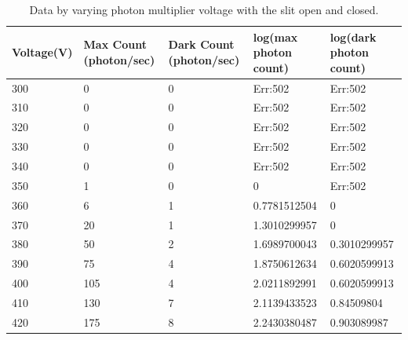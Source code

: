 \documentclass[12pt letterpaper]{article}
\begin{document}
\begin{table}[!htb]
\centering
\caption{Data by varying photon multiplier voltage with the slit open and closed. }
\label{log_photon_count]}
\begin{tabular}{|l|p{1.25cm}|p{1.25cm}|l|l|}
\hline
Voltage(V) & Max Count (photon/sec) & Dark Count (photon/sec) & log(max photon count) & log(dark photon count) \\ \hline
300        & 0                             & 0                              & Err:502               & Err:502                \\ \hline
310        & 0                             & 0                              & Err:502               & Err:502                \\ \hline
320        & 0                             & 0                              & Err:502               & Err:502                \\ \hline
330        & 0                             & 0                              & Err:502               & Err:502                \\ \hline
340        & 0                             & 0                              & Err:502               & Err:502                \\ \hline
350        & 1                             & 0                              & 0                     & Err:502                \\ \hline
360        & 6                             & 1                              & 0.7781512504          & 0                      \\ \hline
370        & 20                            & 1                              & 1.3010299957          & 0                      \\ \hline
380        & 50                            & 2                              & 1.6989700043          & 0.3010299957           \\ \hline
390        & 75                            & 4                              & 1.8750612634          & 0.6020599913           \\ \hline
400        & 105                           & 4                              & 2.0211892991          & 0.6020599913           \\ \hline
410        & 130                           & 7                              & 2.1139433523          & 0.84509804             \\ \hline
420        & 175                           & 8                              & 2.2430380487          & 0.903089987            \\ \hline

\end{tabular}
\end{table}
\end{document}
